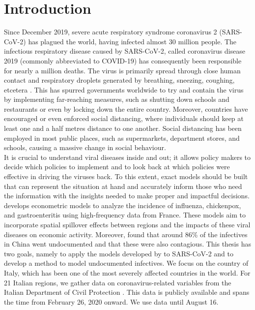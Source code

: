 \documentclass[12pt]{article}
\newenvironment{acknowledgements}{\renewcommand\abstractname{Acknowledgements}\begin{abstract}} {\end{abstract}}
\begin{document}
\begin{acknowledgements}
		
	\end{acknowledgements}
	
	\newpage
	
	\tableofcontents
	
	\newpage
	
	\section{Introduction} \label{sec:introduction}
	Since December 2019, severe acute respiratory syndrome coronavirus 2 (SARS-CoV-2) has plagued the world, having infected almost 30 million people. The infectious respiratory disease caused by SARS-CoV-2, called coronavirus disease 2019 (commonly abbreviated to COVID-19) has consequently been responsible for nearly a million deaths. The virus is primarily spread through close human contact and respiratory droplets generated by breathing, sneezing, coughing, etcetera \parencite{ecdc2020transmission}. This has spurred governments worldwide to try and contain the virus by implementing far-reaching measures, such as shutting down schools and restaurants or even by locking down the entire country. Moreover, countries have encouraged or even enforced social distancing, where individuals should keep at least one and a half metres distance to one another. Social distancing has been employed in most public places, such as supermarkets, department stores, and schools, causing a massive change in social behaviour. \\

	It is crucial to understand viral diseases inside and out; it allows policy makers to decide which policies to implement and to look back at which policies were effective in driving the viruses back. To this extent, exact models should be built that can represent the situation at hand and accurately inform those who need the information with the insights needed to make proper and impactful decisions. \textcite{adda2016economic} develops econometric models to analyze the incidence of influenza, chickenpox, and gastroenteritis using high-frequency data from France. These models aim to incorporate spatial spillover effects between regions and the impacts of these viral diseases on economic activity. Moreover, \textcite{li2020undocumented} found that around 86\% of the infectives in China went undocumented and that these were also contagious. This thesis has two goals, namely to apply the models developed by \textcite{adda2016economic} to SARS-CoV-2 and to develop a method to model undocumented infectives. We focus on the country of Italy, which has been one of the most severely affected countries in the world. For 21 Italian regions, we gather data on coronavirus-related variables from the Italian Department of Civil Protection \parencite{Rosini2020Github}. This data is publicly available and spans the time from February 26, 2020 onward. We use data until August 16. \\
	
\end{document}
